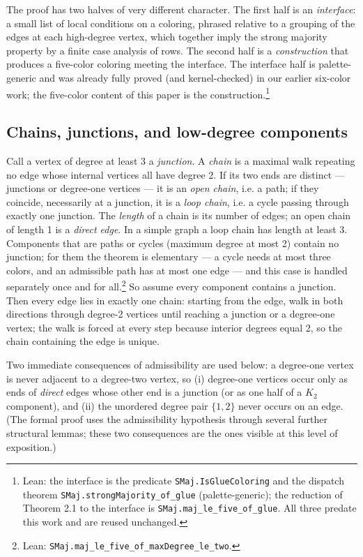 \documentclass[11pt]{article}
\theoremstyle{definition}
\theoremstyle{remark}
\begin{document}
The proof has two halves of very different character. The first half is an \emph{interface}: a small list of local conditions on a coloring, phrased relative to a grouping of the edges at each high-degree vertex, which together imply the strong majority property by a finite case analysis of rows. The second half is a \emph{construction} that produces a five-color coloring meeting the interface. The interface half is palette-generic and was already fully proved (and kernel-checked) in our earlier six-color work; the five-color content of this paper is the construction.\footnote{Lean: the interface is the predicate \texttt{SMaj.IsGlueColoring} and the dispatch theorem \texttt{SMaj.strongMajority\_of\_glue} (palette-generic); the reduction of Theorem 2.1 to the interface is \texttt{SMaj.maj\_le\_five\_of\_glue}. All three predate this work and are reused unchanged.}

\subsection{Chains, junctions, and low-degree components}\label{21-chains-junctions-and-low-degree-components}

Call a vertex of degree at least 3 a \emph{junction}. A \emph{chain} is a maximal walk repeating no edge whose internal vertices all have degree 2. If its two ends are distinct --- junctions or degree-one vertices --- it is an \emph{open chain}, i.e. a path; if they coincide, necessarily at a junction, it is a \emph{loop chain}, i.e. a cycle passing through exactly one junction. The \emph{length} of a chain is its number of edges; an open chain of length 1 is a \emph{direct edge}. In a simple graph a loop chain has length at least 3. Components that are paths or cycles (maximum degree at most 2) contain no junction; for them the theorem is elementary --- a cycle needs at most three colors, and an admissible path has at most one edge --- and this case is handled separately once and for all.\footnote{Lean: \texttt{SMaj.maj\_le\_five\_of\_maxDegree\_le\_two}.} So assume every component contains a junction. Then every edge lies in exactly one chain: starting from the edge, walk in both directions through degree-2 vertices until reaching a junction or a degree-one vertex; the walk is forced at every step because interior degrees equal 2, so the chain containing the edge is unique.

Two immediate consequences of admissibility are used below: a degree-one vertex is never adjacent to a degree-two vertex, so (i) degree-one vertices occur only as ends of \emph{direct} edges whose other end is a junction (or as one half of a \(K_2\) component), and (ii) the unordered degree pair \(\{1,2\}\) never occurs on an edge. (The formal proof uses the admissibility hypothesis through several further structural lemmas; these two consequences are the ones visible at this level of exposition.)
\end{document}
